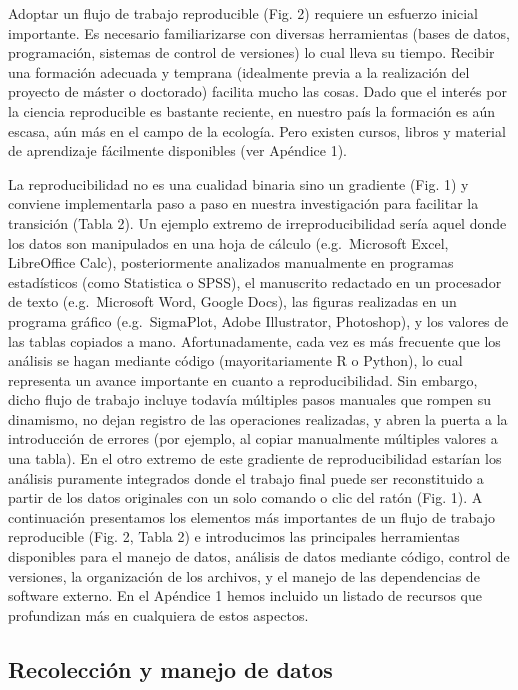 \documentclass[]{tufte-handout}
\begin{document}
Adoptar un flujo de trabajo reproducible (Fig. 2) requiere un esfuerzo
inicial importante. Es necesario familiarizarse con diversas
herramientas (bases de datos, programación, sistemas de control de
versiones) lo cual lleva su tiempo. Recibir una formación adecuada y
temprana (idealmente previa a la realización del proyecto de máster o
doctorado) facilita mucho las cosas. Dado que el interés por la ciencia
reproducible es bastante reciente, en nuestro país la formación es aún
escasa, aún más en el campo de la ecología. Pero existen cursos, libros
y material de aprendizaje fácilmente disponibles (ver Apéndice 1).

La reproducibilidad no es una cualidad binaria sino un gradiente (Fig.
1) y conviene implementarla paso a paso en nuestra investigación para
facilitar la transición (Tabla 2). Un ejemplo extremo de
irreproducibilidad sería aquel donde los datos son manipulados en una
hoja de cálculo (e.g.~Microsoft Excel, LibreOffice Calc), posteriormente
analizados manualmente en programas estadísticos (como Statistica o
SPSS), el manuscrito redactado en un procesador de texto (e.g.~Microsoft
Word, Google Docs), las figuras realizadas en un programa gráfico
(e.g.~SigmaPlot, Adobe Illustrator, Photoshop), y los valores de las
tablas copiados a mano. Afortunadamente, cada vez es más frecuente que
los análisis se hagan mediante código (mayoritariamente R o Python), lo
cual representa un avance importante en cuanto a reproducibilidad. Sin
embargo, dicho flujo de trabajo incluye todavía múltiples pasos manuales
que rompen su dinamismo, no dejan registro de las operaciones
realizadas, y abren la puerta a la introducción de errores (por ejemplo,
al copiar manualmente múltiples valores a una tabla). En el otro extremo
de este gradiente de reproducibilidad estarían los análisis puramente
integrados donde el trabajo final puede ser reconstituido a partir de
los datos originales con un solo comando o clic del ratón (Fig. 1). A
continuación presentamos los elementos más importantes de un flujo de
trabajo reproducible (Fig. 2, Tabla 2) e introducimos las principales
herramientas disponibles para el manejo de datos, análisis de datos
mediante código, control de versiones, la organización de los archivos,
y el manejo de las dependencias de software externo. En el Apéndice 1
hemos incluido un listado de recursos que profundizan más en cualquiera
de estos aspectos.

\hypertarget{recolecciuxf3n-y-manejo-de-datos}{%
\subsection{Recolección y manejo de
datos}\label{recolecciuxf3n-y-manejo-de-datos}}
\end{document}
